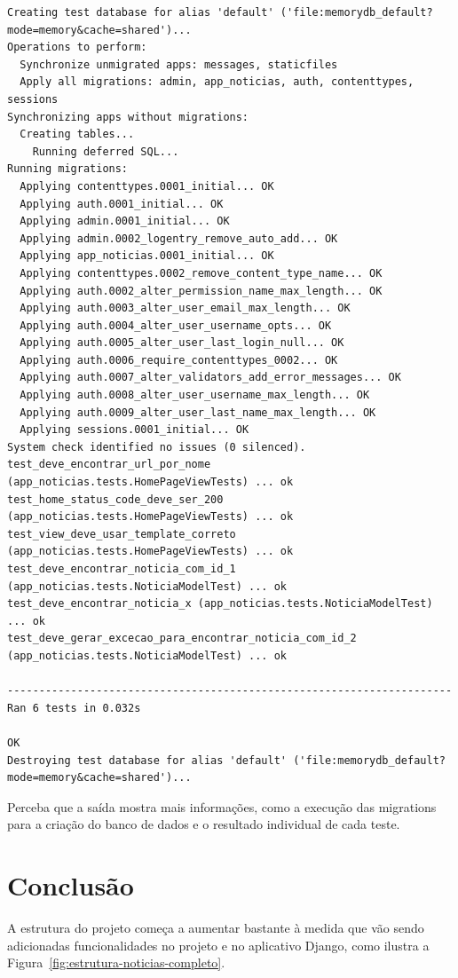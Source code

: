 \documentclass[brazil,a4paper,oneside,openright,parskip=full]{book}
\begin{document}
\begin{lstlisting}[style=nonumber]
Creating test database for alias 'default' ('file:memorydb_default?mode=memory&cache=shared')...
Operations to perform:
  Synchronize unmigrated apps: messages, staticfiles
  Apply all migrations: admin, app_noticias, auth, contenttypes, sessions
Synchronizing apps without migrations:
  Creating tables...
    Running deferred SQL...
Running migrations:
  Applying contenttypes.0001_initial... OK
  Applying auth.0001_initial... OK
  Applying admin.0001_initial... OK
  Applying admin.0002_logentry_remove_auto_add... OK
  Applying app_noticias.0001_initial... OK
  Applying contenttypes.0002_remove_content_type_name... OK
  Applying auth.0002_alter_permission_name_max_length... OK
  Applying auth.0003_alter_user_email_max_length... OK
  Applying auth.0004_alter_user_username_opts... OK
  Applying auth.0005_alter_user_last_login_null... OK
  Applying auth.0006_require_contenttypes_0002... OK
  Applying auth.0007_alter_validators_add_error_messages... OK
  Applying auth.0008_alter_user_username_max_length... OK
  Applying auth.0009_alter_user_last_name_max_length... OK
  Applying sessions.0001_initial... OK
System check identified no issues (0 silenced).
test_deve_encontrar_url_por_nome (app_noticias.tests.HomePageViewTests) ... ok
test_home_status_code_deve_ser_200 (app_noticias.tests.HomePageViewTests) ... ok
test_view_deve_usar_template_correto (app_noticias.tests.HomePageViewTests) ... ok
test_deve_encontrar_noticia_com_id_1 (app_noticias.tests.NoticiaModelTest) ... ok
test_deve_encontrar_noticia_x (app_noticias.tests.NoticiaModelTest) ... ok
test_deve_gerar_excecao_para_encontrar_noticia_com_id_2 (app_noticias.tests.NoticiaModelTest) ... ok

----------------------------------------------------------------------
Ran 6 tests in 0.032s

OK
Destroying test database for alias 'default' ('file:memorydb_default?mode=memory&cache=shared')...
\end{lstlisting}

Perceba que a saída mostra mais informações, como a execução das
migrations para a criação do banco de dados e o resultado individual de
cada teste.

\hypertarget{conclusuxe3o-1}{%
\section{Conclusão}\label{conclusuxe3o-1}}

A estrutura do projeto começa a aumentar bastante à medida que vão sendo
adicionadas funcionalidades no projeto e no aplicativo Django, como
ilustra a Figura~\ref{fig:estrutura-noticias-completo}.
\end{document}
